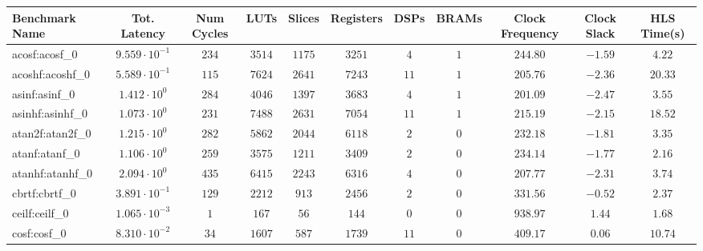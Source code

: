 \begin{tabular}{|l|c|c|c|c|c|c|c|c|c|c|}
\hline
Benchmark Name               & Tot. Latency            & Num Cycles & LUTs       & Slices    & Registers  & DSPs    & BRAMs & Clock Frequency & Clock Slack & HLS Time(s) \\
\hline
acosf:acosf\_0               & $ 9.559 \cdot 10^{-1} $ & $ 234    $ & $ 3514   $ & $ 1175  $ & $ 3251   $ & $ 4   $ & $ 1 $ & $ 244.80      $ & $ -1.59   $ & $ 4.22    $ \\
acoshf:acoshf\_0             & $ 5.589 \cdot 10^{-1} $ & $ 115    $ & $ 7624   $ & $ 2641  $ & $ 7243   $ & $ 11  $ & $ 1 $ & $ 205.76      $ & $ -2.36   $ & $ 20.33   $ \\
asinf:asinf\_0               & $ 1.412 \cdot 10^{0}  $ & $ 284    $ & $ 4046   $ & $ 1397  $ & $ 3683   $ & $ 4   $ & $ 1 $ & $ 201.09      $ & $ -2.47   $ & $ 3.55    $ \\
asinhf:asinhf\_0             & $ 1.073 \cdot 10^{0}  $ & $ 231    $ & $ 7488   $ & $ 2631  $ & $ 7054   $ & $ 11  $ & $ 1 $ & $ 215.19      $ & $ -2.15   $ & $ 18.52   $ \\
atan2f:atan2f\_0             & $ 1.215 \cdot 10^{0}  $ & $ 282    $ & $ 5862   $ & $ 2044  $ & $ 6118   $ & $ 2   $ & $ 0 $ & $ 232.18      $ & $ -1.81   $ & $ 3.35    $ \\
atanf:atanf\_0               & $ 1.106 \cdot 10^{0}  $ & $ 259    $ & $ 3575   $ & $ 1211  $ & $ 3409   $ & $ 2   $ & $ 0 $ & $ 234.14      $ & $ -1.77   $ & $ 2.16    $ \\
atanhf:atanhf\_0             & $ 2.094 \cdot 10^{0}  $ & $ 435    $ & $ 6415   $ & $ 2243  $ & $ 6316   $ & $ 4   $ & $ 0 $ & $ 207.77      $ & $ -2.31   $ & $ 3.74    $ \\
cbrtf:cbrtf\_0               & $ 3.891 \cdot 10^{-1} $ & $ 129    $ & $ 2212   $ & $ 913   $ & $ 2456   $ & $ 2   $ & $ 0 $ & $ 331.56      $ & $ -0.52   $ & $ 2.37    $ \\
ceilf:ceilf\_0               & $ 1.065 \cdot 10^{-3} $ & $ 1      $ & $ 167    $ & $ 56    $ & $ 144    $ & $ 0   $ & $ 0 $ & $ 938.97      $ & $ 1.44    $ & $ 1.68    $ \\
cosf:cosf\_0                 & $ 8.310 \cdot 10^{-2} $ & $ 34     $ & $ 1607   $ & $ 587   $ & $ 1739   $ & $ 11  $ & $ 0 $ & $ 409.17      $ & $ 0.06    $ & $ 10.74   $ \\

\end{tabular}
